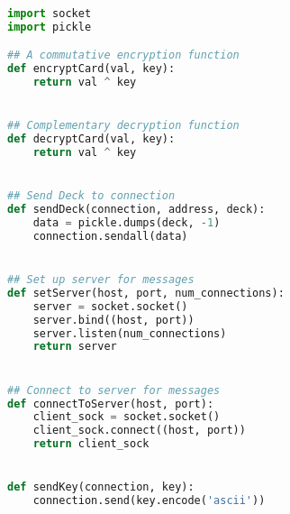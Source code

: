 \documentclass{article}
\begin{document}
\begin{lstlisting}[language=Python, caption=helpers.py]
import socket
import pickle

## A commutative encryption function
def encryptCard(val, key):
    return val ^ key


## Complementary decryption function
def decryptCard(val, key):
    return val ^ key


## Send Deck to connection
def sendDeck(connection, address, deck):
    data = pickle.dumps(deck, -1)
    connection.sendall(data)


## Set up server for messages
def setServer(host, port, num_connections):
    server = socket.socket()
    server.bind((host, port))
    server.listen(num_connections)
    return server


## Connect to server for messages
def connectToServer(host, port):
    client_sock = socket.socket()
    client_sock.connect((host, port))
    return client_sock


def sendKey(connection, key):
    connection.send(key.encode('ascii'))
\end{lstlisting}
\end{document}
